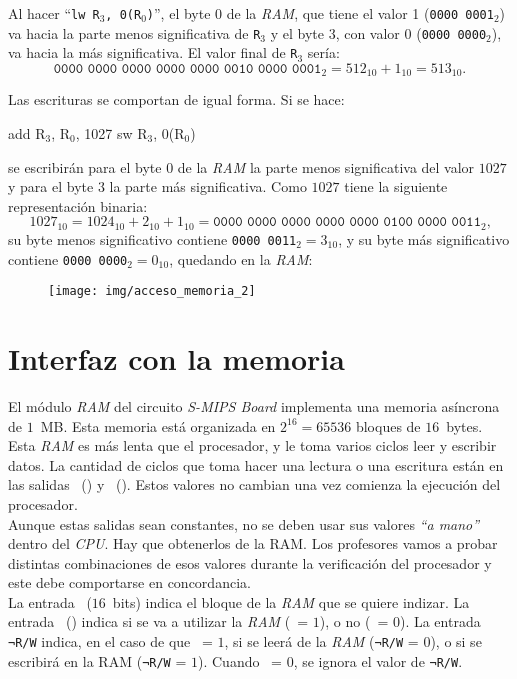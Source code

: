 \documentclass[12pt]{amsart}
\begin{document}
	Al hacer ``\texttt{lw R$_3$, 0(R$_0$)}'', el byte $0$ de la \textit{RAM}, que tiene el valor 1 (\texttt{0000 0001}$_2$) va hacia la parte menos significativa de \texttt{R$_3$} y el byte $3$, con valor $0$ (\texttt{0000 0000}$_2$), va hacia la más significativa. El valor final de \texttt{R$_3$} sería:
	$$\texttt{0000 0000 0000 0000 0000 0010 0000 0001}_2 = 512_{10} + 1_{10} = 513_{10}.$$
	
	Las escrituras se comportan de igual forma. Si se hace:
	\begin{itemize}
		\ttfamily
		\pto add R$_3$, R$_0$, 1027
		\pto sw R$_3$, 0(R$_0$)
	\end{itemize}
	se escribirán para el byte $0$ de la \textit{RAM} la parte menos significativa del valor $1027$ y para el byte $3$ la parte más significativa. Como $1027$ tiene la siguiente representación binaria:
	$$1027_{10} = 1024_{10} + 2_{10} + 1_{10} = \texttt{0000 0000 0000 0000 0000 0100 0000 0011}_2\textrm{,}$$
	su byte menos significativo contiene \texttt{0000 0011}$_2 = 3_{10}$, y su byte más significativo contiene \texttt{0000 0000}$_2 = 0_{10}$, quedando en la \textit{RAM}:
	\begin{figure}[H]
		\centering
		\texttt{[image: img/acceso\_memoria\_2]}
		\label{fig:accesomemoria2}
	\end{figure}
	
	\section{Interfaz con la memoria}
	
	El módulo \textit{RAM} del circuito \textit{S-MIPS Board} implementa una memoria asíncrona de $1$~MB. Esta memoria está organizada en $2^{16} = 65536$ bloques de $16$~bytes. Esta \textit{RAM} es más lenta que el procesador, y le toma varios ciclos leer y escribir datos. La cantidad de ciclos que toma hacer una lectura o una escritura están en las salidas \RT\ (\ReadTime) y \WT\ (\WriteTime). Estos valores no cambian una vez comienza la ejecución del procesador.\\
	
	Aunque estas salidas sean constantes, no se deben usar sus valores \textit{``a mano''} dentro del \textit{CPU}. Hay que obtenerlos de la RAM. Los profesores vamos a probar distintas combinaciones de esos valores durante la verificación del procesador y este debe comportarse en concordancia.\\
	
	La entrada \ADDR\ ($16$~bits) indica el bloque de la \textit{RAM} que se quiere indizar.  La entrada \CS\ (\ChipSelect) indica si se va a utilizar la \textit{RAM} (\CS\ = $1$), o no (\CS\ = $0$). La entrada \texttt{¬R/W} indica, en el caso de que \CS\ = $1$, si se leerá de la \textit{RAM} (\texttt{¬R/W} = $0$), o si se escribirá en la RAM (\texttt{¬R/W} = $1$). Cuando \CS\ = $0$, se ignora el valor de \texttt{¬R/W}.\\
	
\end{document}
